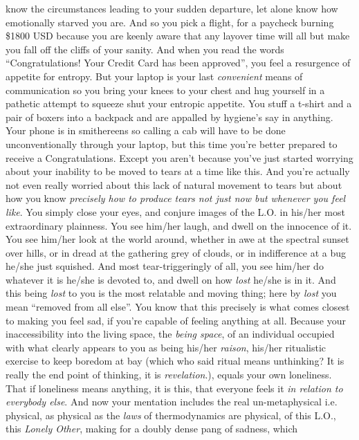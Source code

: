\documentclass{article}
\begin{document}
know the circumstances leading to your sudden departure, let alone know
how emotionally starved you are. And so you pick a flight, for
a paycheck burning \$1800 USD because you are keenly aware that any
layover time will all but make you fall off the cliffs of your sanity.
And when you read the words ``Congratulations! Your Credit Card has been
approved'', you feel a resurgence of appetite for entropy. But your
laptop is your last \textit{convenient} means of communication so you
bring your knees to your chest and hug yourself in a pathetic attempt to
squeeze shut your entropic appetite. You stuff a t-shirt and a pair of
boxers into a backpack and are appalled by hygiene's say in anything.
Your phone is in smithereens so calling a cab will have to be done
unconventionally through your laptop, but this time you're better
prepared to receive a Congratulations. Except you aren't because you've
just started worrying about your inability to be moved to  tears at
a time like this. And you're actually not even really worried about this
lack of natural movement to tears but about how you know
\textit{precisely how to produce tears not just now but whenever you
feel like}. You simply close your eyes, and conjure images of the L.O.
in his/her most extraordinary plainness. You see him/her laugh, and
dwell on the innocence of it. You see him/her look at the world around,
whether in awe at the spectral sunset over hills, or in dread at the
gathering grey of clouds, or in indifference at a bug he/she just
squished. And most tear-triggeringly of all, you see him/her do whatever
it is he/she is devoted to, and dwell on how \textit{lost} he/she is in
it. And this being \textit{lost} to you is the most relatable and moving
thing; here by \textit{lost} you mean ``removed from all else''. You
know that this precisely is what comes closest to making you feel sad,
if you're capable of feeling anything at all. Because your
inaccessibility into the living space, the \textit{being space}, of an
individual occupied with what clearly appears to you as being his/her
\textit{raison}, his/her ritualistic exercise to keep boredom at bay
(which who said ritual means unthinking? It is really the end point of
thinking, it is \textit{revelation}.), equals your own loneliness. That
if loneliness means anything, it is this, that everyone feels it
\textit{in relation to everybody else}. And now your mentation includes
the real un-metaphysical i.e. physical, as physical as the \textit{laws}
of thermodynamics are physical,  of this L.O., this
\textit{Lonely Other}, making for a doubly dense pang of sadness, which
\end{document}
